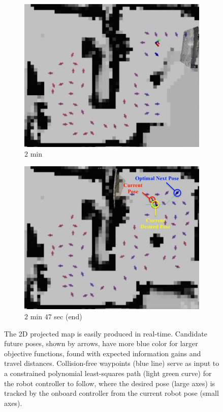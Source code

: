 \documentclass[smallextended]{svjour3}       %
\begin{document}
\begin{figure}[!t]
    	\begin{subfigure}[t]{0.44\columnwidth}
           	\centering
          	\includegraphics[width=\textwidth]{experiment_2min_2D.jpg}
        		\caption{$2$ min}
    	\end{subfigure}
    	\begin{subfigure}[t]{0.44\columnwidth}
           	\centering
          	\includegraphics[width=\textwidth]{experiment_2min47sec_2D_labeled.jpeg}
        		\caption{$2$ min $47$ sec (end)}
    	\end{subfigure}
	\caption{The 2D projected map is easily produced in real-time. Candidate future poses, shown by arrows, have more blue color for larger objective functions, found with expected information gains and travel distances. Collision-free waypoints (blue line) serve as input to a constrained polynomial least-squares path (light green curve) for the robot controller to follow, where the desired pose (large axes) is tracked by the onboard controller from the current robot pose (small axes).}
	\label{fig:exp2DMap}
\end{figure}
\end{document}
